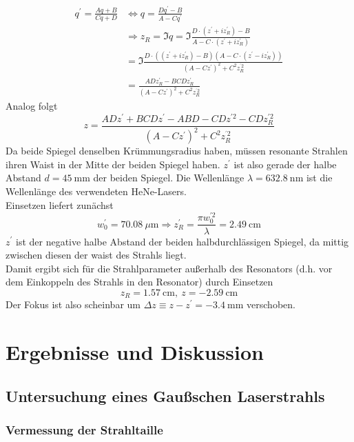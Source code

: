 \documentclass[11pt,a4paper,oneside]{scrartcl}
\begin{document}
\begin{align}
q^\prime=\frac{Aq+B}{Cq+D}& \iff q = \frac{Dq^\prime-B}{A-Cq^\prime}\\ & \Rightarrow z_R=\Im{q}=\Im{\frac{D\cdot (z^\prime+iz_R^\prime)-B}{A-C\cdot(z^\prime+iz_R^\prime)}}\\ \quad&=\Im{\frac{D\cdot ((z^\prime+iz_R^\prime)-B)(A-C\cdot(z^\prime-iz_R^\prime))}{(A-Cz^\prime)^2+C^2z_R^{^\prime 2}}}\\ \quad&
=\frac{ADz_R^\prime-BCDz_R^\prime}{(A-Cz^\prime)^2+C^2z_R^{^\prime 2}}
\end{align}
Analog folgt 
\begin{equation}
z=\frac{ADz^\prime+BCDz^\prime-ABD-CDz^{\prime 2}-CDz_R^{\prime 2}}{(A-Cz^\prime)^2+C^2z_R^{^\prime 2}}
\end{equation}
Da beide Spiegel denselben Krümmungsradius haben, müssen resonante Strahlen ihren Waist in der Mitte der beiden Spiegel haben. $z^\prime$ ist also gerade der halbe Abstand $d=45\ \mathrm{mm}$ der beiden Spiegel. Die Wellenlänge $\lambda=632.8\ \mathrm{nm}$ ist die Wellenlänge des verwendeten HeNe-Lasers. \\
Einsetzen liefert zunächst
\begin{equation}
w_0^\prime = 70.08\ \mu\mathrm m\Rightarrow z_R^\prime = \frac{\pi w_0^{\prime 2}}{\lambda} = 2.49\ \mathrm{cm}
\end{equation}
 $z^\prime$ ist der negative halbe Abstand der beiden halbdurchlässigen Spiegel, da mittig zwischen diesen der waist des Strahls liegt. \\
Damit ergibt sich für die Strahlparameter außerhalb des Resonators (d.h. vor dem Einkoppeln des Strahls in den Resonator) durch Einsetzen
\begin{equation}
z_R = 1.57\ \mathrm{cm},\ z = -2.59\ \mathrm{cm}
\end{equation}
Der Fokus ist also scheinbar um $\Delta z\equiv z-z^\prime = -3.4\ \mathrm{mm}$ verschoben. 


\section{Ergebnisse und Diskussion}
\subsection{Untersuchung eines Gaußschen Laserstrahls}
\subsubsection{Vermessung der Strahltaille}
\end{document}
